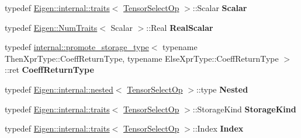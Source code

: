 \begin{DoxyCompactItemize}
\item 
\mbox{\label{class_eigen_1_1_tensor_select_op_a7ee8b8d25ef298c4306f92fd84fdade1}} 
typedef \hyperlink{struct_eigen_1_1internal_1_1traits}{Eigen\+::internal\+::traits}$<$ \hyperlink{class_eigen_1_1_tensor_select_op}{Tensor\+Select\+Op} $>$\+::Scalar {\bfseries Scalar}
\item 
\mbox{\label{class_eigen_1_1_tensor_select_op_a5bfd8aa9d9929830330922fb52778d17}} 
typedef \hyperlink{group___core___module_struct_eigen_1_1_num_traits}{Eigen\+::\+Num\+Traits}$<$ Scalar $>$\+::Real {\bfseries Real\+Scalar}
\item 
\mbox{\label{class_eigen_1_1_tensor_select_op_adf3382ce42bcc784fc87fea06381d40a}} 
typedef \hyperlink{struct_eigen_1_1internal_1_1promote__storage__type}{internal\+::promote\+\_\+storage\+\_\+type}$<$ typename Then\+Xpr\+Type\+::\+Coeff\+Return\+Type, typename Else\+Xpr\+Type\+::\+Coeff\+Return\+Type $>$\+::ret {\bfseries Coeff\+Return\+Type}
\item 
\mbox{\label{class_eigen_1_1_tensor_select_op_a644d1b2a9a11191e5f503a284d6de0ce}} 
typedef \hyperlink{struct_eigen_1_1internal_1_1nested}{Eigen\+::internal\+::nested}$<$ \hyperlink{class_eigen_1_1_tensor_select_op}{Tensor\+Select\+Op} $>$\+::type {\bfseries Nested}
\item 
\mbox{\label{class_eigen_1_1_tensor_select_op_a6d9c4142f12439114687b51a0e7d622d}} 
typedef \hyperlink{struct_eigen_1_1internal_1_1traits}{Eigen\+::internal\+::traits}$<$ \hyperlink{class_eigen_1_1_tensor_select_op}{Tensor\+Select\+Op} $>$\+::Storage\+Kind {\bfseries Storage\+Kind}
\item 
\mbox{\label{class_eigen_1_1_tensor_select_op_a2c538caf796accb9e63a9b8a08909dfb}} 
typedef \hyperlink{struct_eigen_1_1internal_1_1traits}{Eigen\+::internal\+::traits}$<$ \hyperlink{class_eigen_1_1_tensor_select_op}{Tensor\+Select\+Op} $>$\+::Index {\bfseries Index}
\end{DoxyCompactItemize}
